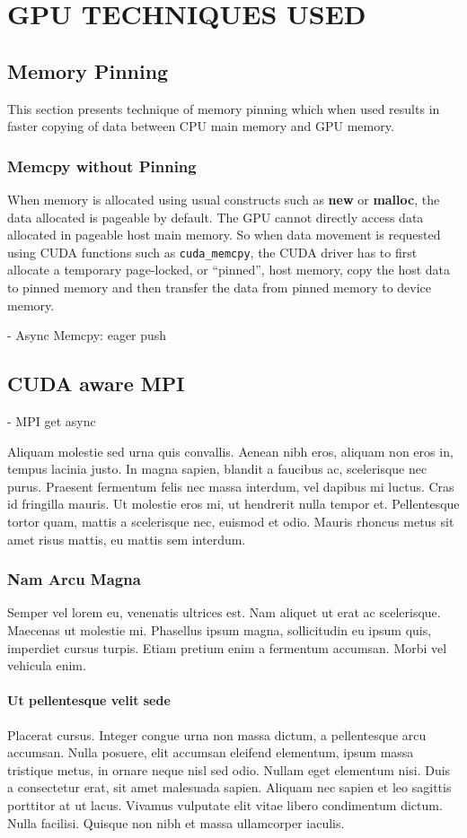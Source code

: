 \chapter{GPU TECHNIQUES USED} \label{gputechniques}

\section{Memory Pinning}
This section presents technique of memory pinning which when used results in
faster copying of data between CPU main memory and GPU memory.

\subsection{Memcpy without Pinning}
When memory is allocated using usual constructs such as \textbf{new} or
\textbf{malloc}, the data allocated is pageable by default. The GPU cannot
directly access data allocated in pageable host main memory. So when data
movement is requested using CUDA functions such as \texttt{cuda\_memcpy}, the
CUDA driver has to first allocate a temporary page-locked, or ``pinned'', host
memory, copy the host data to pinned memory and then transfer the data from
pinned memory to device memory.

- Async Memcpy: eager push

\section{CUDA aware MPI}
- MPI get async

Aliquam molestie sed urna quis convallis. Aenean nibh eros, aliquam non eros in, tempus lacinia justo. In magna sapien, blandit a faucibus ac, scelerisque nec purus. Praesent fermentum felis nec massa interdum, vel dapibus mi luctus. Cras id fringilla mauris. Ut molestie eros mi, ut hendrerit nulla tempor et. Pellentesque tortor quam, mattis a scelerisque nec, euismod et odio. Mauris rhoncus metus sit amet risus mattis, eu mattis sem interdum.

\subsection{Nam Arcu Magna}
Semper vel lorem eu, venenatis ultrices est. Nam aliquet ut erat ac scelerisque. Maecenas ut molestie mi. Phasellus ipsum magna, sollicitudin eu ipsum quis, imperdiet cursus turpis. Etiam pretium enim a fermentum accumsan. Morbi vel vehicula enim.

\subsubsection{Ut pellentesque velit sede}
 Placerat cursus. Integer congue urna non massa dictum, a pellentesque arcu accumsan. Nulla posuere, elit accumsan eleifend elementum, ipsum massa tristique metus, in ornare neque nisl sed odio. Nullam eget elementum nisi. Duis a consectetur erat, sit amet malesuada sapien. Aliquam nec sapien et leo sagittis porttitor at ut lacus. Vivamus vulputate elit vitae libero condimentum dictum. Nulla facilisi. Quisque non nibh et massa ullamcorper iaculis.